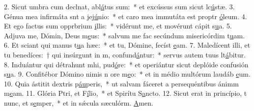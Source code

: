 2. Sicut umbra cum declnat, abl\uline{á}tus sum:~* et excússus sum sicut lc\uline{ú}stæ.
3. Génua mea infirmáta snt a jej\uline{ú}nio:~* et caro mea immutáta est proptr \uline{ó}leum.
4. Et ego factus sum opprbrium \uline{i}llis:~* vidérunt me, et movérunt cápit s\uline{u}a.
5. Adjuva me, Dómin, Deus m\uline{e}us:~* salvum me fac secúndum misericórdim t\uline{u}am.
6. Et sciant qui manus t\uline{u}a hæc:~* et tu, Dómine, fecíst \uline{e}am.
7. Maledícent illi, et tu benedíces:~† qui insúrgunt in m, confund\uline{á}ntur:~* servus autem tuus lt\uline{á}bitur.
8. Induántur qui détrahunt mhi, pud\uline{ó}re:~* et operiántur sicut deplóide confusión s\uline{u}a.
9. Confitébor Dómino nimis n ore m\uline{e}o:~* et in médio multórum laudáb \uline{e}um.
10. Quia ástitit  dextris p\uline{áu}peris,~* ut salvam fáceret a persequéntibus ánimm m\uline{e}am.
11. Glória Ptri, et F\uline{í}lio,~* et Spirítu S\uline{a}ncto.
12. Sicut erat in princípio, t nunc, et s\uline{e}mper,~* et in sǽcula sæculórm. \uline{A}men.
